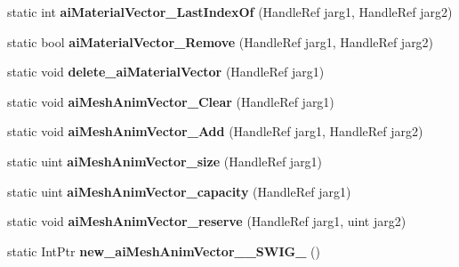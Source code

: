 \begin{DoxyCompactItemize}
\item 
\hypertarget{class_assimp_p_i_n_v_o_k_e_a01ba9772bddab4c11f898793215460d9}{static int {\bfseries ai\+Material\+Vector\+\_\+\+Last\+Index\+Of} (Handle\+Ref jarg1, Handle\+Ref jarg2)}\label{class_assimp_p_i_n_v_o_k_e_a01ba9772bddab4c11f898793215460d9}

\item 
\hypertarget{class_assimp_p_i_n_v_o_k_e_a4b85bb06c65d6d09caa21e28542e8d7e}{static bool {\bfseries ai\+Material\+Vector\+\_\+\+Remove} (Handle\+Ref jarg1, Handle\+Ref jarg2)}\label{class_assimp_p_i_n_v_o_k_e_a4b85bb06c65d6d09caa21e28542e8d7e}

\item 
\hypertarget{class_assimp_p_i_n_v_o_k_e_a71e1a51f5b1a138568b8941519438664}{static void {\bfseries delete\+\_\+ai\+Material\+Vector} (Handle\+Ref jarg1)}\label{class_assimp_p_i_n_v_o_k_e_a71e1a51f5b1a138568b8941519438664}

\item 
\hypertarget{class_assimp_p_i_n_v_o_k_e_ace4956aa058227d9e88a9289e562cb92}{static void {\bfseries ai\+Mesh\+Anim\+Vector\+\_\+\+Clear} (Handle\+Ref jarg1)}\label{class_assimp_p_i_n_v_o_k_e_ace4956aa058227d9e88a9289e562cb92}

\item 
\hypertarget{class_assimp_p_i_n_v_o_k_e_a0b61d972998c7db4b416f14ebedca7a1}{static void {\bfseries ai\+Mesh\+Anim\+Vector\+\_\+\+Add} (Handle\+Ref jarg1, Handle\+Ref jarg2)}\label{class_assimp_p_i_n_v_o_k_e_a0b61d972998c7db4b416f14ebedca7a1}

\item 
\hypertarget{class_assimp_p_i_n_v_o_k_e_af12b4a76738520f78c6d27533289173c}{static uint {\bfseries ai\+Mesh\+Anim\+Vector\+\_\+size} (Handle\+Ref jarg1)}\label{class_assimp_p_i_n_v_o_k_e_af12b4a76738520f78c6d27533289173c}

\item 
\hypertarget{class_assimp_p_i_n_v_o_k_e_a5d33f22231fe46917506057ff1c58ae7}{static uint {\bfseries ai\+Mesh\+Anim\+Vector\+\_\+capacity} (Handle\+Ref jarg1)}\label{class_assimp_p_i_n_v_o_k_e_a5d33f22231fe46917506057ff1c58ae7}

\item 
\hypertarget{class_assimp_p_i_n_v_o_k_e_a6d11907771b9eec313a563788c3a89d4}{static void {\bfseries ai\+Mesh\+Anim\+Vector\+\_\+reserve} (Handle\+Ref jarg1, uint jarg2)}\label{class_assimp_p_i_n_v_o_k_e_a6d11907771b9eec313a563788c3a89d4}

\item 
\hypertarget{class_assimp_p_i_n_v_o_k_e_a852e34ed30c9ff27ea3dbe0abba19633}{static Int\+Ptr {\bfseries new\+\_\+ai\+Mesh\+Anim\+Vector\+\_\+\+\_\+\+S\+W\+I\+G\+\_} ()}\label{class_assimp_p_i_n_v_o_k_e_a852e34ed30c9ff27ea3dbe0abba19633}


\end{DoxyCompactItemize}

